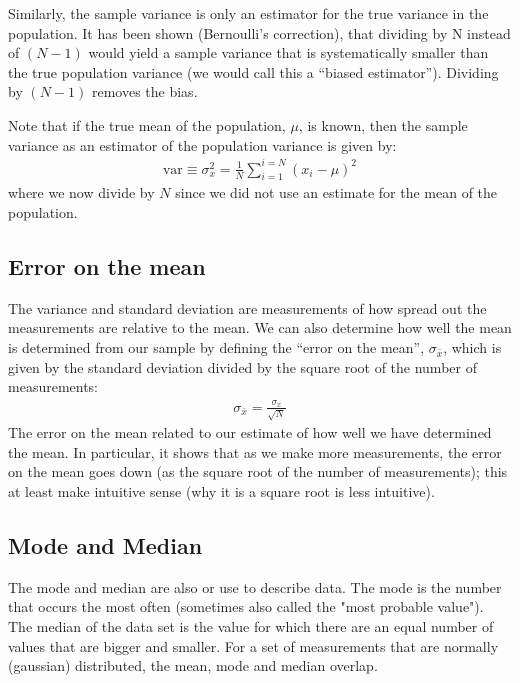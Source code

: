 Similarly, the sample variance is only an estimator for the true variance in the population. It has been shown (Bernoulli's correction), that dividing by N instead of $(N-1)$ would yield a sample variance that is systematically smaller than the true population variance (we would call this a ``biased estimator''). Dividing by $(N-1)$ removes the bias. 

Note that if the true mean of the population, $\mu$, is known, then the sample variance as an estimator of the population variance is given by:
\begin{align}
 \text{var}\equiv \sigma_x^2 = \frac{1}{N} \sum_{i=1}^{i=N} (x_i-\mu)^2 
\end{align}
where we now divide by $N$ since we did not use an estimate for the mean of the population.
 
\subsection{Error on the mean} 
The variance and standard deviation are measurements of how spread out the measurements are relative to the mean. We can also determine how well the mean is determined from our sample by defining the ``error on the mean'', $\sigma_{\bar x}$, which is given by the standard deviation divided by the square root of the number of measurements:
\begin{align}
 \sigma_{\bar x}= \frac{\sigma_x}{\sqrt N}
\end{align}
The error on the mean related to our estimate of how well we have determined the mean. In particular, it shows that as we make more measurements, the error on the mean goes down (as the square root of the number of measurements); this at least make intuitive sense (why it is a square root is less intuitive).
 
\subsection{Mode and Median}

The mode and median are also or use to describe data. The mode is the number that occurs the most often (sometimes also called the "most probable value"). The median of the data set is the value for which there are an equal number of values that are bigger and smaller. For a set of measurements that are normally (gaussian) distributed, the mean, mode and median overlap.

